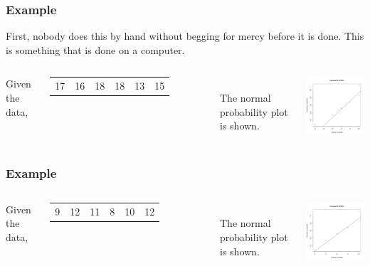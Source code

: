 \begin{frame}
  \frametitle{Example}

  First, nobody does this by hand without begging for mercy before it
  is done. This is something that is done on a computer.

  \begin{columns}

    Given the data, \\
    \begin{tabular}{llllll}
      17 & 16 & 18 & 18 & 13 & 15
    \end{tabular} \\
    The normal probability plot is shown.


  \includegraphics[width=5cm]{img/normalQQEx1}

  \end{columns}
  
  
\end{frame}

\begin{frame}
  \frametitle{Example}


  \begin{columns}

    Given the data, \\
    \begin{tabular}{llllll}
      9 & 12 & 11 & 8 & 10 & 12
    \end{tabular} \\
    The normal probability plot is shown.


  \includegraphics[width=5cm]{img/normalQQEx2}

  \end{columns}
  
  
\end{frame}


